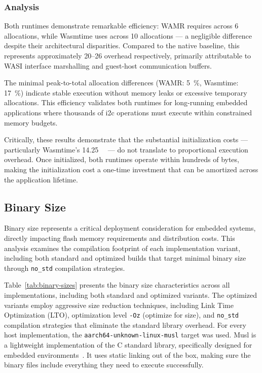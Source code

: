 \subsubsection{Analysis}

Both runtimes demonstrate remarkable efficiency: WAMR requires  across 6 allocations, while Wasmtime uses  across 10 allocations --- a negligible  difference despite their architectural disparities. Compared to the  native baseline, this represents approximately \SIrange[round-precision=0]{20}{26}{\times} overhead respectively, primarily attributable to WASI interface marshalling and guest-host communication buffers.

The minimal peak-to-total allocation differences (WAMR: \SI[round-precision=0]{5}{\percent}, Wasmtime: \SI[round-precision=0]{17}{\percent}) indicate stable execution without memory leaks or excessive temporary allocations. This efficiency validates both runtimes for long-running embedded applications where thousands of \acrshort{i2c} operations must execute within constrained memory budgets.

Critically, these results demonstrate that the substantial initialization costs --- particularly Wasmtime's \SI{14.25}{\mega\byte} --- do not translate to proportional execution overhead. Once initialized, both runtimes operate within hundreds of bytes, making the initialization cost a one-time investment that can be amortized across the application lifetime.

\subsection{Binary Size}
\label{subsec:binary-size}

Binary size represents a critical deployment consideration for embedded systems, directly impacting flash memory requirements and distribution costs. This analysis examines the compilation footprint of each implementation variant, including both standard and optimized builds that target minimal binary size through \texttt{no\_std} compilation strategies.

Table~\ref{tab:binary-sizes} presents the binary size characteristics across all implementations, including both standard and optimized variants. The optimized variants employ aggressive size reduction techniques, including Link Time Optimization (LTO), optimization level \texttt{-Oz} (optimize for size), and \texttt{no\_std} compilation strategies that eliminate the standard library overhead. For every host implementation, the \texttt{aarch64-unknown-linux-musl} target was used. Musl is a lightweight implementation of the C standard library, specifically designed for embedded environments~\cite{musl}. It uses static linking out of the box, making sure the binary files include everything they need to execute successfully.

